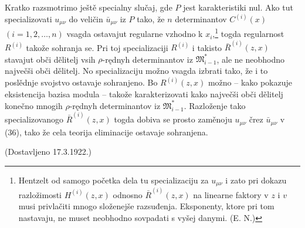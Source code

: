 \documentclass[11pt]{article}
\providecommand{\Mmod}{\mathfrak M}
\begin{document}
Kratko razsmotrimo ještě specialny slučaj, gde $P$ jest karakteristiki nul. Ako tut specializovati $u_{\mu\nu}$ do veličin $\bar u_{\mu\nu}$ iz $P$ tako, že $n$ determinantov $C^{(i)}(x)$ $(i=1,2,\ldots,n)$ vsagda ostavajut regularne vzhodno k $x_i$,\footnote{\mbox{Hentzelt} od samogo početka dela tu specializaciju za $u_{\mu\nu}$ i zato pri dokazu razložimosti $H^{(i)}(z,x)$ odnosno $\bar R^{(i)}(z,x)$ na linearne faktory v $z$ i $v$ musi privlačiti mnogo složenejše razsuđenja. Eksponenty, ktore pri tom nastavaju, ne muset neobhodno sovpadati s vyšej danymi. (E. N.)} togda regularnost $R^{(i)}$ takože sohranja se. Pri toj specializaciji $R^{(i)}$ i takisto $\bar R^{(i)}(z,x)$ stavajut obči dělitelj vsih $\rho$-rędnyh determinantov iz $\Mmod^*_{i-1}$, ale ne neobhodno največši obči dělitelj. No specializaciju možno vsagda izbrati tako, že i to poslědnje svojstvo ostavaje sohranjeno. Bo $R^{(i)}(z,x)$ možno -- kako pokazuje eksistencija bazisa modula -- takože karakterizovati kako največši obči dělitelj konečno mnogih $\rho$-rędnyh determinantov iz $\Mmod^*_{i-1}$. Razloženje tako specializovanogo $\bar R^{(i)}(z,x)$ togda dobiva se prosto zaměnoju $u_{\mu\nu}$ črez $\bar u_{\mu\nu}$ v (36), tako že cela teorija eliminacije ostavaje sohranjena.

\begin{center}
(Dostavljeno 17.3.1922.)
\end{center}
\end{document}

